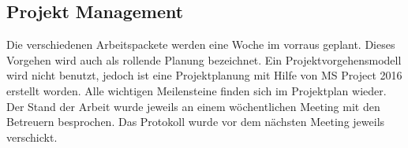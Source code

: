    \subsection{Projekt Management}
      Die verschiedenen Arbeitspackete werden eine Woche im vorraus geplant.
      Dieses Vorgehen wird auch als rollende Planung bezeichnet.
      Ein Projektvorgehensmodell wird nicht benutzt, jedoch ist eine Projektplanung mit Hilfe von MS Project 2016
      erstellt worden. Alle wichtigen Meilensteine finden sich im Projektplan wieder.
      Der Stand der Arbeit wurde jeweils an einem wöchentlichen Meeting mit den Betreuern besprochen.
      Das Protokoll wurde vor dem nächsten Meeting jeweils verschickt.
